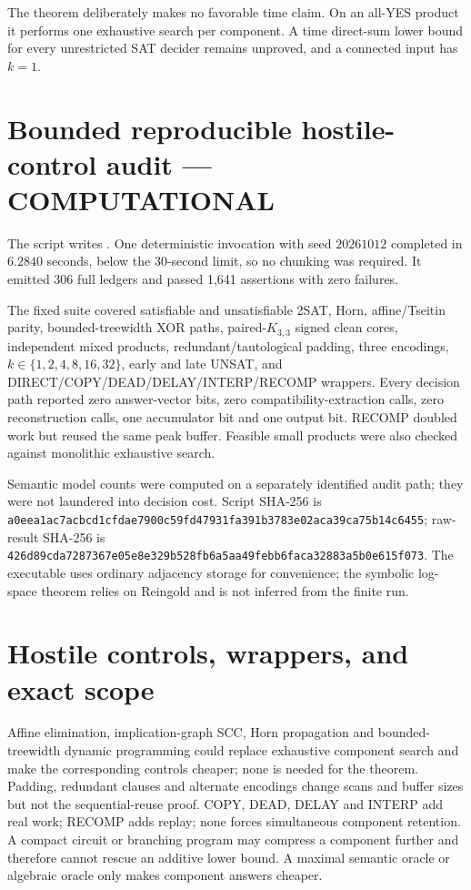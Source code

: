\documentclass[11pt]{article}
\newcommand{\COMP}{\textbf{COMPUTATIONAL}}
\begin{document}
The theorem deliberately makes no favorable time claim.  On an all-YES
product it performs one exhaustive search per component.  A time direct-sum
lower bound for every unrestricted SAT decider remains unproved, and a
connected input has $k=1$.

\section{Bounded reproducible hostile-control audit --- \COMP}

The script
writes
.
One deterministic invocation with seed $20261012$ completed in $6.2840$
seconds, below the 30-second limit, so no chunking was required.  It emitted
306 full ledgers and passed 1,641 assertions with zero failures.

The fixed suite covered satisfiable and unsatisfiable 2SAT, Horn,
affine/Tseitin parity, bounded-treewidth XOR paths, paired-$K_{3,3}$ signed
clean cores, independent mixed products, redundant/tautological padding,
three encodings, $k\in\{1,2,4,8,16,32\}$, early and late UNSAT, and
DIRECT/COPY/DEAD/DELAY/INTERP/RECOMP wrappers.  Every decision path reported
zero answer-vector bits, zero compatibility-extraction calls, zero
reconstruction calls, one accumulator bit and one output bit.  RECOMP doubled
work but reused the same peak buffer.  Feasible small products were also
checked against monolithic exhaustive search.

Semantic model counts were computed on a separately identified audit path;
they were not laundered into decision cost.  Script SHA-256 is
\nolinkurl{a0eea1ac7acbcd1cfdae7900c59fd47931fa391b3783e02aca39ca75b14c6455};
raw-result SHA-256 is
\nolinkurl{426d89cda7287367e05e8e329b528fb6a5aa49febb6faca32883a5b0e615f073}.
The executable uses ordinary adjacency storage for convenience; the symbolic
log-space theorem relies on Reingold and is not inferred from the finite run.

\section{Hostile controls, wrappers, and exact scope}

Affine elimination, implication-graph SCC, Horn propagation and bounded-
treewidth dynamic programming could replace exhaustive component search and
make the corresponding controls cheaper; none is needed for the theorem.
Padding, redundant clauses and alternate encodings change scans and buffer
sizes but not the sequential-reuse proof.  COPY, DEAD, DELAY and INTERP add
real work; RECOMP adds replay; none forces simultaneous component retention.
A compact circuit or branching program may compress a component further and
therefore cannot rescue an additive lower bound.  A maximal semantic oracle
or algebraic oracle only makes component answers cheaper.
\end{document}

